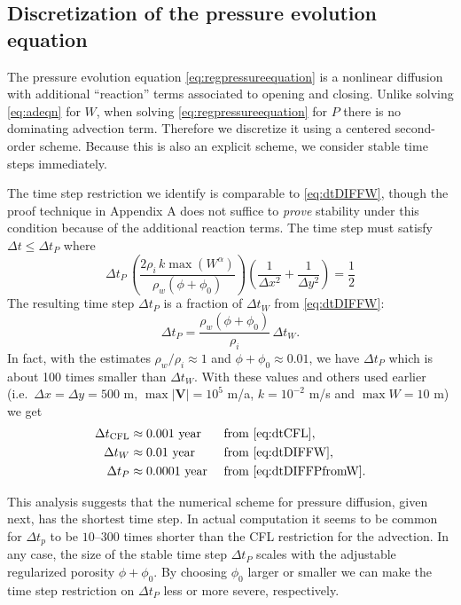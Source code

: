 \documentclass[11pt,final]{amsart}
\newcommand\bV{\mathbf{V}}
\begin{document}
\subsection*{Discretization of the pressure evolution equation}  The pressure evolution equation \eqref{eq:regpressureequation} is a nonlinear diffusion with additional ``reaction'' terms associated to opening and closing.  Unlike solving \eqref{eq:adeqn} for $W$, when solving \eqref{eq:regpressureequation} for $P$ there is no dominating advection term.  Therefore we discretize it using a centered second-order scheme.  Because this is also an explicit scheme, we consider stable time steps immediately.

The time step restriction we identify is comparable to \eqref{eq:dtDIFFW}, though the proof technique in Appendix A does not suffice to \emph{prove} stability under this condition because of the additional reaction terms.  The time step must satisfy $\Delta t \le \Delta t_P$ where
\begin{equation}
\Delta t_P\, \left(\frac{2 \rho_i\, k \max(W^\alpha)}{\rho_w (\phi+\phi_0)}\right) \left(\frac{1}{\Delta x^2} + \frac{1}{\Delta y^2}\right) = \frac{1}{2} \label{eq:dtDIFFP}
\end{equation}
The resulting time step $\Delta t_P$ is a fraction of $\Delta t_W$ from \eqref{eq:dtDIFFW}:
\begin{equation}
\Delta t_P = \frac{\rho_w (\phi+\phi_0)}{\rho_i}\, \Delta t_W.  \label{eq:dtDIFFPfromW}
\end{equation}
In fact, with the estimates $\rho_w/\rho_i \approx 1$ and $\phi+\phi_0 \approx 0.01$, we have $\Delta t_P$ which is about 100 times smaller than $\Delta t_W$.  With these values and others used earlier (i.e.~$\Delta x = \Delta y = 500$ m, $\max |\bV|=10^5$ m/a, $k=10^{-2}$ m/s and $\max W=10$ m) we get
\begin{align*}
  \Delta t_{\text{CFL}} &\approx 0.001  \text{ year} &&\text{ from \eqref{eq:dtCFL}}, \\
  \Delta t_W            &\approx 0.01   \text{ year} &&\text{ from \eqref{eq:dtDIFFW}}, \\
  \Delta t_P            &\approx 0.0001 \text{ year} &&\text{ from \eqref{eq:dtDIFFPfromW}.}
\end{align*}

This analysis suggests that the numerical scheme for pressure diffusion, given next, has the shortest time step.  In actual computation it seems to be common for $\Delta t_p$ to be $10$--$300$ times shorter than the CFL restriction for the advection.  In any case, the size of the stable time step $\Delta t_P$ scales with the adjustable regularized porosity $\phi+\phi_0$.  By choosing $\phi_0$ larger or smaller we can make the time step restriction on $\Delta t_P$ less or more severe, respectively.
\end{document}
